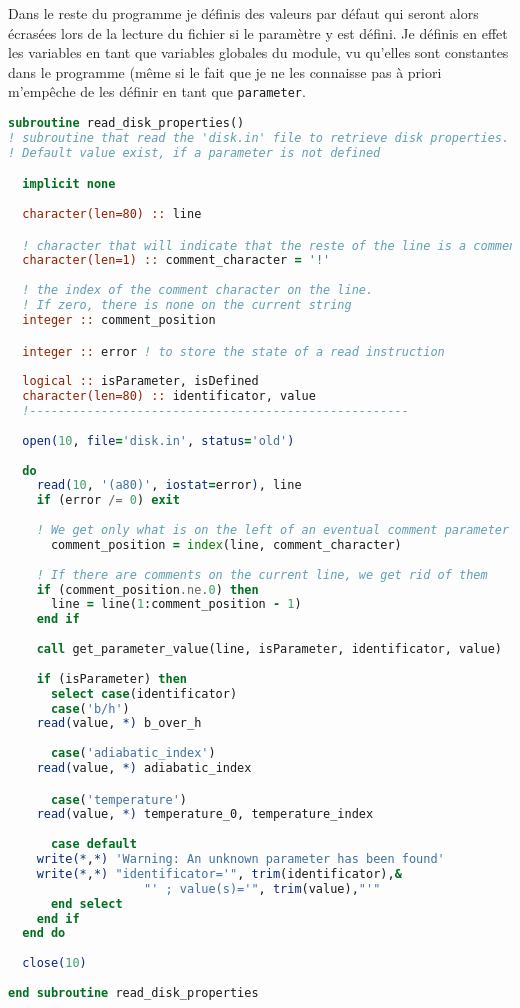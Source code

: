 \begin{remarque}
Dans le reste du programme je définis des valeurs par défaut qui seront alors écrasées lors de la lecture du fichier si le paramètre y est défini. Je définis en effet les variables en tant que variables globales du module, vu qu'elles sont constantes dans le programme (même si le fait que je ne les connaisse pas à priori m'empêche de les définir en tant que \texttt{parameter}.
\end{remarque}


\begin{lstlisting}[language=Fortran]
subroutine read_disk_properties()
! subroutine that read the 'disk.in' file to retrieve disk properties. 
! Default value exist, if a parameter is not defined

  implicit none
  
  character(len=80) :: line

  ! character that will indicate that the reste of the line is a comment
  character(len=1) :: comment_character = '!' 
  
  ! the index of the comment character on the line. 
  ! If zero, there is none on the current string
  integer :: comment_position 

  integer :: error ! to store the state of a read instruction
  
  logical :: isParameter, isDefined
  character(len=80) :: identificator, value
  !-----------------------------------------------------
  
  open(10, file='disk.in', status='old')
  
  do
    read(10, '(a80)', iostat=error), line
    if (error /= 0) exit
      
    ! We get only what is on the left of an eventual comment parameter
      comment_position = index(line, comment_character)
    
    ! If there are comments on the current line, we get rid of them
    if (comment_position.ne.0) then
      line = line(1:comment_position - 1)
    end if
    
    call get_parameter_value(line, isParameter, identificator, value)
      
    if (isParameter) then
      select case(identificator)
      case('b/h')
	read(value, *) b_over_h
      
      case('adiabatic_index')
	read(value, *) adiabatic_index

      case('temperature')
	read(value, *) temperature_0, temperature_index
	
      case default
	write(*,*) 'Warning: An unknown parameter has been found'
	write(*,*) "identificator='", trim(identificator),&
                   "' ; value(s)='", trim(value),"'"
      end select
    end if
  end do
  
  close(10)
    
end subroutine read_disk_properties
\end{lstlisting}


